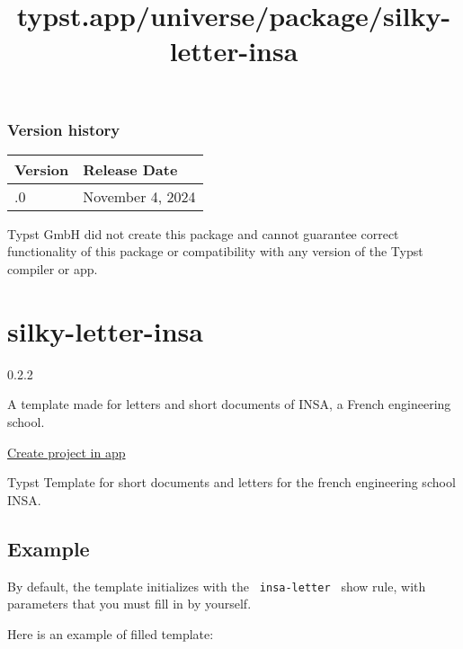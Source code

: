 \label{versions}
\subsubsection{Version history}\label{version-history}

\begin{longtable}[]{@{}ll@{}}
\toprule\noalign{}
Version & Release Date \\
\midrule\noalign{}
\endhead
\bottomrule\noalign{}
\endlastfoot
0.1.0 & November 4, 2024 \\
\end{longtable}

Typst GmbH did not create this package and cannot guarantee correct
functionality of this package or compatibility with any version of the
Typst compiler or app.


\title{typst.app/universe/package/silky-letter-insa}

\label{banner}
\label{template-thumbnail}

\section{silky-letter-insa}\label{silky-letter-insa}

{ 0.2.2 }

A template made for letters and short documents of INSA, a French
engineering school.

\href{/app?template=silky-letter-insa&version=0.2.2}{Create project in
app}

\label{readme}
Typst Template for short documents and letters for the french
engineering school INSA.

\subsection{Example}\label{example}

By default, the template initializes with the \texttt{\ insa-letter\ }
show rule, with parameters that you must fill in by yourself.

Here is an example of filled template:

